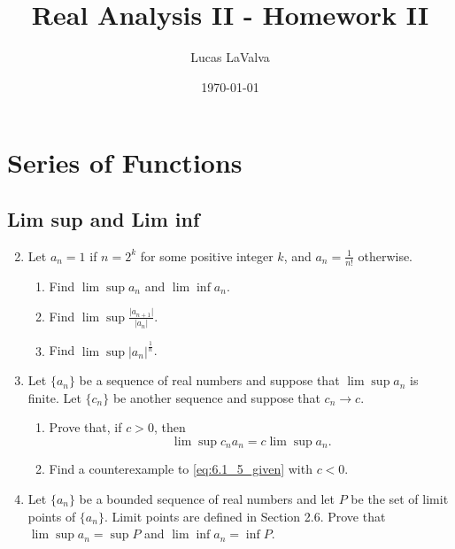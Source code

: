 \documentclass{article}
\title{Real Analysis II - Homework II}
\author{Lucas LaValva}
\date{\today}
\begin{document}
\maketitle

\setcounter{section}{5}

\section{Series of Functions}

\subsection{Lim sup and Lim inf}
\begin{enumerate}
    \setcounter{enumi}{1}
    \item Let $a_n=1$ if $n=2^k$ for some positive integer $k$,
          and $a_n=\frac{1}{n!}$ otherwise.
          \begin{enumerate}
              \item Find $\lim\sup a_n$ and $\lim\inf a_n$.
              \item Find $\lim\sup\frac{\lvert a_{n+1}\rvert}{\lvert a_n\rvert}$.
              \item Find $\lim\sup\lvert a_n\rvert^\frac{1}{n}$.
          \end{enumerate}
          \setcounter{enumi}{4}
    \item Let $\{a_n\}$ be a sequence of real numbers and suppose
          that $\lim\sup a_n$ is finite. Let $\{c_n\}$ be another
          sequence and suppose that $c_n\to c$.
          \begin{enumerate}
              \item Prove that, if $c>0$, then
                    \begin{equation}
                        \lim\sup c_na_n = c\lim\sup a_n.
                        \label{eq:6.1_5_given}
                    \end{equation}
              \item Find a counterexample to \eqref{eq:6.1_5_given}
                    with $c<0$.
          \end{enumerate}
          \setcounter{enumi}{8}
    \item Let $\{a_n\}$ be a bounded sequence of real numbers and
          let $P$ be the set of limit points of $\{a_n\}$. Limit
          points are defined in Section 2.6. Prove that
          $\lim\sup a_n=\sup P$ and $\lim\inf a_n=\inf P$.
\end{enumerate}
\end{document}
